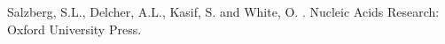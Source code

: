 \documentclass[11pt,letterpaper]{article}
\begin{document}
\begin{thebibliography}{}

Salzberg, S.L., Delcher, A.L., Kasif, S. and White, O.
.
\newblock Nucleic Acids Research: Oxford University Press.

\end{thebibliography}
\end{document}
